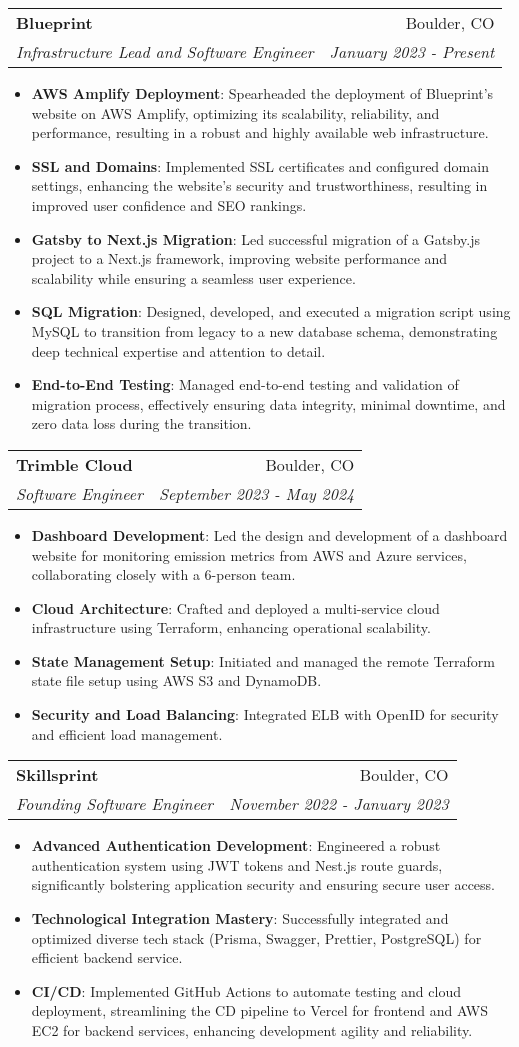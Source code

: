 \documentclass[letterpaper,11pt]{article}
\makeatletter
\newcommand{\resumeItem}[2]{
  \item\small{
    \textbf{#1}{: #2 \vspace{-2pt}}
  }
}
\newcommand{\resumeSubheading}[4]{
  \vspace{-1pt}\item
    \begin{tabular*}{0.97\textwidth}[t]{l@{\extracolsep{\fill}}r}
      \textbf{#1} & #2\vspace{-2pt} \\
      \textit{\small#3} & \textit{\small #4} \\
    \end{tabular*}\vspace{-8pt}
}
\newcommand{\resumeItemListStart}{\begin{itemize}}
\newcommand{\resumeItemListEnd}{\end{itemize}\vspace{-8pt}}
\makeatother
\begin{document}
\resumeSubheading
{Blueprint}{Boulder, CO}
{Infrastructure Lead and Software Engineer}{January 2023 - Present}
\resumeItemListStart
\resumeItem{AWS Amplify Deployment}
{Spearheaded the deployment of Blueprint's website on AWS Amplify, optimizing its scalability, reliability, and performance, resulting in a robust and highly available web infrastructure.}
\resumeItem{SSL and Domains}
{Implemented SSL certificates and configured domain settings, enhancing the website's security and trustworthiness, resulting in improved user confidence and SEO rankings.}
\resumeItem{Gatsby to Next.js Migration}
{Led successful migration of a Gatsby.js project to a Next.js framework, improving website performance and scalability while ensuring a seamless user experience.}
\resumeItem{SQL Migration}
{Designed, developed, and executed a migration script using MySQL to transition from legacy to a new database schema, demonstrating deep technical expertise and attention to detail.}
\resumeItem{End-to-End Testing}
{Managed end-to-end testing and validation of migration process, effectively ensuring data integrity, minimal downtime, and zero data loss during the transition.}
\resumeItemListEnd

\resumeSubheading
{Trimble Cloud }{Boulder, CO}
{Software Engineer}{September 2023 - May 2024}
\resumeItemListStart
\resumeItem{Dashboard Development}
{Led the design and development of a dashboard website for monitoring emission metrics from AWS and Azure services, collaborating closely with a 6-person team.}
\resumeItem{Cloud Architecture}
{Crafted and deployed a multi-service cloud infrastructure using Terraform, enhancing operational scalability.}
\resumeItem{State Management Setup}
{Initiated and managed the remote Terraform state file setup using AWS S3 and DynamoDB.}
\resumeItem{Security and Load Balancing}{Integrated ELB with OpenID for security and efficient load management.}
\resumeItemListEnd

\resumeSubheading
{Skillsprint}{Boulder, CO}
{Founding Software Engineer}{November 2022 - January 2023}
\resumeItemListStart
\resumeItem{Advanced Authentication Development}
{Engineered a robust authentication system using JWT tokens and Nest.js route guards, significantly bolstering application security and ensuring secure user access.}
\resumeItem{Technological Integration Mastery}
{Successfully integrated and optimized diverse tech stack (Prisma, Swagger, Prettier, PostgreSQL) for efficient backend service.}
\resumeItem{CI/CD}
{Implemented GitHub Actions to automate testing and cloud deployment, streamlining the CD pipeline to Vercel for frontend and AWS EC2 for backend services, enhancing development agility and reliability.}
\resumeItemListEnd
\end{document}

